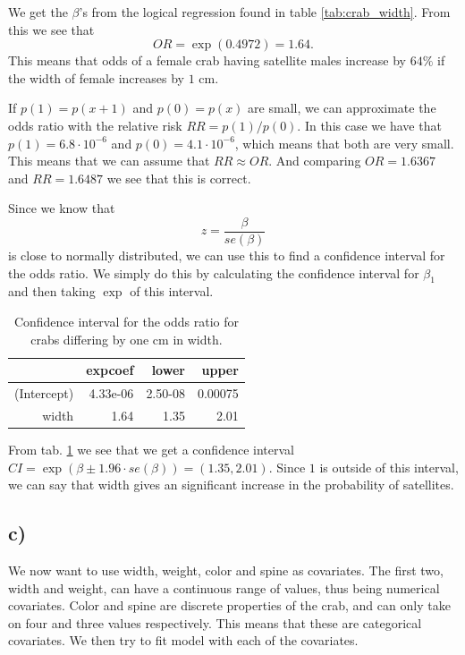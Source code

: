 \documentclass[a4paper,norsk, 10pt]{article}
\begin{document}
We get the $\beta$'s from the logical regression found in table \ref{tab:crab_width}. From this we see that 
\begin{equation}
OR = \exp(0.4972) = 1.64.
\end{equation}
This means that odds of a female crab having satellite males increase by $64\%$ if the width of female increases by $1$ cm.

If $p(1) = p(x+1)$ and $p(0)=p(x)$ are small, we can approximate the odds ratio with the relative risk $RR = p(1)/p(0)$. In this case we have that $p(1) = 6.8\cdot 10^{-6}$ and $p(0) = 4.1 \cdot 10^{-6}$, which means that both are very small. This means that we can assume that $RR \approx OR$. And comparing $OR = 1.6367$ and $RR = 1.6487$ we see that this is correct.

Since we know that 
\begin{equation}
z = \frac{\beta}{se(\beta)}
\end{equation}
is close to normally distributed, we can use this to find a confidence interval for the odds ratio. We simply do this by calculating the confidence interval for $\beta_1$ and then taking $\exp$ of this interval. 

\begin{table}[!ht]
\centering
\begin{tabular}{rrrr}
  \hline
 & expcoef & lower & upper \\ 
  \hline
(Intercept) & 4.33e-06 & 2.50-08 & 0.00075 \\ 
  width & 1.64 & 1.35 & 2.01 \\ 
   \hline
\end{tabular}
\caption{Confidence interval for the odds ratio for crabs differing by one cm in width.}\label{tab:crabs_OR_CI}
\end{table}

From tab. \ref{tab:crabs_OR_CI} we see that we get a confidence interval $CI = \exp(\beta \pm 1.96\cdot se(\beta)) = (1.35,2.01)$. Since $1$ is outside of this interval, we can say that width gives an significant increase in the probability of satellites. 

\subsection{c)}
We now want to use width, weight, color and spine as covariates. The first two, width and weight, can have a continuous range of values, thus being numerical covariates. Color and spine are discrete properties of the crab, and can only take on four and three values respectively. This means that these are categorical covariates. We then try to fit model with each of the covariates.
\end{document}
